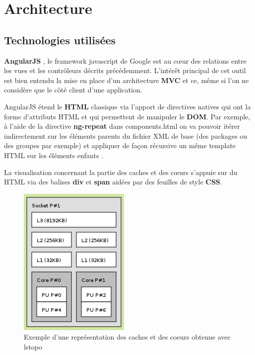 \documentclass [a4paper,11pt]{article}
\begin{document}
\newpage

\section{Architecture}

\subsection{Technologies utilisées}
\textbf{AngularJS} \cite{angular}, le framework javascript de Google est au cœur des relations entre les vues et les contrôleurs décrits précédemment. L’intérêt principal de cet outil est bien entendu la mise en place d’un architecture \textbf{MVC} et ce, même si l’on ne considère que le côté client d’une application.
\newline

AngularJS étend le \textbf{HTML} classique via l’apport de directives natives qui ont la forme d’attributs HTML et qui permettent de manipuler le \textbf{DOM}. Par exemple, à l’aide de la directive \textbf{ng-repeat} dans components.html on va pouvoir itérer indirectement sur les éléments parents du fichier XML de base (des packages ou des groupes par exemple) et appliquer de façon récursive un même template HTML sur les éléments enfants \cite{Foster14}.
\newline

La visualisation concernant la partie des caches et des cœurs s’appuie sur du HTML via des balises \textbf{div} et \textbf{span} aidées par des feuilles de style \textbf{CSS}.

\newpage

\begin{figure}[!h]
\centering
\includegraphics[scale=0.5]{img/caches.png}
\caption[Résultats]{Exemple d'une représentation des caches et des coeurs obtenue avec lstopo}
\end{figure}
\end{document}
